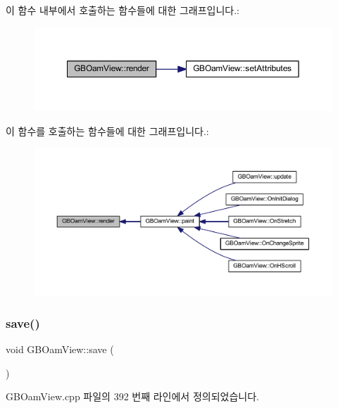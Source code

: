 이 함수 내부에서 호출하는 함수들에 대한 그래프입니다.\+:
\nopagebreak
\begin{figure}[H]
\begin{center}
\leavevmode
\includegraphics[width=350pt]{class_g_b_oam_view_a6862114f9b3873d08f7ae8bd465c2eda_cgraph}
\end{center}
\end{figure}
이 함수를 호출하는 함수들에 대한 그래프입니다.\+:
\nopagebreak
\begin{figure}[H]
\begin{center}
\leavevmode
\includegraphics[width=350pt]{class_g_b_oam_view_a6862114f9b3873d08f7ae8bd465c2eda_icgraph}
\end{center}
\end{figure}
\mbox{\label{class_g_b_oam_view_a04f7a345e1f9d71b149b9df3b2db30d4}} 
\subsubsection{\texorpdfstring{save()}{save()}}
{\footnotesize\ttfamily void G\+B\+Oam\+View\+::save (\begin{DoxyParamCaption}{ }\end{DoxyParamCaption})}



G\+B\+Oam\+View.\+cpp 파일의 392 번째 라인에서 정의되었습니다.


